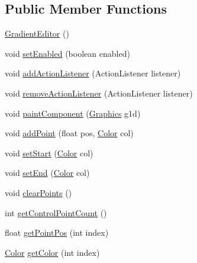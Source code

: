 \subsection*{Public Member Functions}
\begin{DoxyCompactItemize}
\item 
\mbox{\hyperlink{classorg_1_1newdawn_1_1slick_1_1tools_1_1peditor_1_1_gradient_editor_a7a25caadeab2ef681a8b0be92e50c840}{Gradient\+Editor}} ()
\item 
void \mbox{\hyperlink{classorg_1_1newdawn_1_1slick_1_1tools_1_1peditor_1_1_gradient_editor_a651cd84461a9a820c44991be64aced5b}{set\+Enabled}} (boolean enabled)
\item 
void \mbox{\hyperlink{classorg_1_1newdawn_1_1slick_1_1tools_1_1peditor_1_1_gradient_editor_adfc5a15f2330a3441ab6d26b3ab196b3}{add\+Action\+Listener}} (Action\+Listener listener)
\item 
void \mbox{\hyperlink{classorg_1_1newdawn_1_1slick_1_1tools_1_1peditor_1_1_gradient_editor_a46a474cd6b36488e7932f546e0d0a739}{remove\+Action\+Listener}} (Action\+Listener listener)
\item 
void \mbox{\hyperlink{classorg_1_1newdawn_1_1slick_1_1tools_1_1peditor_1_1_gradient_editor_a53a69811eba6b5483aff87fcb816519c}{paint\+Component}} (\mbox{\hyperlink{classorg_1_1newdawn_1_1slick_1_1_graphics}{Graphics}} g1d)
\item 
void \mbox{\hyperlink{classorg_1_1newdawn_1_1slick_1_1tools_1_1peditor_1_1_gradient_editor_a3aa831c1a5141803fd1af2a827a94128}{add\+Point}} (float pos, \mbox{\hyperlink{classorg_1_1newdawn_1_1slick_1_1_color}{Color}} col)
\item 
void \mbox{\hyperlink{classorg_1_1newdawn_1_1slick_1_1tools_1_1peditor_1_1_gradient_editor_a279e633c22815808d42458246a345762}{set\+Start}} (\mbox{\hyperlink{classorg_1_1newdawn_1_1slick_1_1_color}{Color}} col)
\item 
void \mbox{\hyperlink{classorg_1_1newdawn_1_1slick_1_1tools_1_1peditor_1_1_gradient_editor_a661c1384fa5d5355fafbf1df4c9828a6}{set\+End}} (\mbox{\hyperlink{classorg_1_1newdawn_1_1slick_1_1_color}{Color}} col)
\item 
void \mbox{\hyperlink{classorg_1_1newdawn_1_1slick_1_1tools_1_1peditor_1_1_gradient_editor_a6ad73dd621e91f72e03aba155fb26b4c}{clear\+Points}} ()
\item 
int \mbox{\hyperlink{classorg_1_1newdawn_1_1slick_1_1tools_1_1peditor_1_1_gradient_editor_a4f95317d30d12190d621cc6f11d15b58}{get\+Control\+Point\+Count}} ()
\item 
float \mbox{\hyperlink{classorg_1_1newdawn_1_1slick_1_1tools_1_1peditor_1_1_gradient_editor_a19b98960cfc745fc6821e21e4e27eaf5}{get\+Point\+Pos}} (int index)
\item 
\mbox{\hyperlink{classorg_1_1newdawn_1_1slick_1_1_color}{Color}} \mbox{\hyperlink{classorg_1_1newdawn_1_1slick_1_1tools_1_1peditor_1_1_gradient_editor_a98675405a4d61ae603ebd578143d5fb7}{get\+Color}} (int index)
\end{DoxyCompactItemize}
